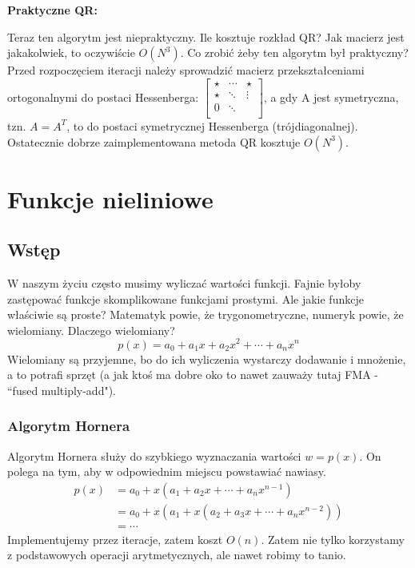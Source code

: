 \documentclass[hidelinks,a4paper,fleqn,oneside]{book}
\begin{document}
\textbf{Praktyczne QR:}

Teraz ten algorytm jest niepraktyczny. Ile kosztuje rozkład QR? Jak macierz jest jakakolwiek, to oczywiście $O(N^3)$. Co zrobić żeby ten algorytm był praktyczny? Przed rozpoczęciem iteracji należy sprowadzić macierz przekształceniami ortogonalnymi do postaci Hessenberga: $\left[ \begin{array}{cccc} \star & \cdots & \star \\ \star & \ddots & \vdots \\ 0 & \ddots \\  \end{array} \right]$, a gdy A jest symetryczna, tzn. $A=A^T$, to do postaci symetrycznej Hessenberga (trójdiagonalnej). Ostatecznie dobrze zaimplementowana metoda QR kosztuje $O(N^3)$.

\chapter{Funkcje nieliniowe}

\section{Wstęp}

W naszym życiu często musimy wyliczać wartości funkcji. Fajnie byłoby zastępować funkcje skomplikowane funkcjami prostymi. Ale jakie funkcje właściwie są proste? Matematyk powie, że trygonometryczne, numeryk powie, że wielomiany. Dlaczego wielomiany?
\[
p(x) = a_0 + a_1x + a_2x^2 + \cdots + a_nx^n
\]
Wielomiany są przyjemne, bo do ich wyliczenia wystarczy dodawanie i mnożenie, a to potrafi sprzęt (a jak ktoś ma dobre oko to nawet zauważy tutaj FMA - ``fused multiply-add").

\subsection{Algorytm Hornera} 
Algorytm Hornera służy do szybkiego wyznaczania wartości $w = p(x)$. On polega na tym, aby w odpowiednim miejscu powstawiać nawiasy.
\begin{align*}
	p(x) & = a_0 + x(a_1 + a_2x + \cdots + a_nx^{n-1}) \\
	& = a_0 + x (a_1 + x(a_2 + a_3 x + \cdots + a_nx^{n-2})) \\
	& = \cdots
\end{align*}
Implementujemy przez iteracje, zatem koszt $O(n)$. Zatem nie tylko korzystamy z podstawowych operacji arytmetycznych, ale nawet robimy to tanio. 
\end{document}
